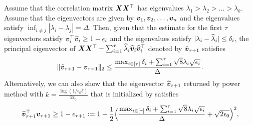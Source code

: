 \begin{lemma}\label{lm3.2}
Assume that the correlation matrix $\boldsymbol{X}\boldsymbol{X}^\top$ has eigenvalues $\lambda_1>\lambda_2>\ldots>\lambda_{k}$. Assume that the eigenvectors are given by $\boldsymbol{v}_1,\boldsymbol{v}_2,\ldots,\boldsymbol{v}_n$ and the eigenvalues satisfy $\inf_{i\neq j}|\lambda_i-\lambda_j|=\Delta$. Then, given that the estimate for the first $\tau$ eigenvectors satisfy
$    \boldsymbol{v}_i^\top\widehat{\boldsymbol{v}}_i\geq 1-\epsilon_i $ and the eigenvalues satisfy $|\lambda_i-\widehat{\lambda}_i|\leq\delta_i$, the principal eigenvector of $\boldsymbol{X}\boldsymbol{X}^\top-\sum_{i=1}^{\tau}\widehat{\lambda}_i\widehat{\boldsymbol{v}}_i\widehat{\boldsymbol{v}}_i^\top$ denoted by $\tilde{\boldsymbol{v}}_{\tau+1}$ satisfies
\begin{align*}
    \Vert\tilde{\boldsymbol{v}}_{\tau+1}-\boldsymbol{v}_{\tau+1}\Vert_2 \leq\frac{\max_{i\in[\tau]}\delta_i+\sum_{i=1}^\tau\sqrt8\lambda_i\sqrt{\epsilon_i}}{\Delta}.
\end{align*}
Alternatively, we can also show that the eigenvector $\widehat{\boldsymbol{v}}_{\tau+1}$ returned by power method with $k= \frac{\log(1/\epsilon_0\delta)}{2\epsilon_0}$ that is initialized by  satisfies
\begin{align*}
    \widehat{\boldsymbol{v}}_{\tau+1}^\top\boldsymbol{v}_{\tau+1} \geq 1-\epsilon_{\tau+1}:=  1-\frac{1}{2}\Big(\frac{\max_{i\in[\tau]}\delta_i+\sum_{i=1}^{\tau}\sqrt{8}\lambda_i\sqrt{\epsilon_i}}{\Delta}+\sqrt{2\epsilon_0}\Big)^2,
\end{align*}
\end{lemma}
